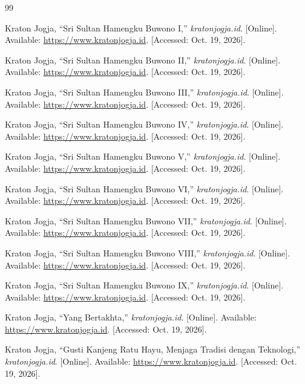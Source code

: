 \documentclass[11pt,a4paper]{article}
\begin{document}
\begin{thebibliography}{99}
\raggedright
{}

 Kraton Jogja, ``Sri Sultan Hamengku Buwono I,'' \emph{kratonjogja.id}. [Online]. Available: \url{https://www.kratonjogja.id}. [Accessed: Oct. 19, 2026].

 Kraton Jogja, ``Sri Sultan Hamengku Buwono II,'' \emph{kratonjogja.id}. [Online]. Available: \url{https://www.kratonjogja.id}. [Accessed: Oct. 19, 2026].

 Kraton Jogja, ``Sri Sultan Hamengku Buwono III,'' \emph{kratonjogja.id}. [Online]. Available: \url{https://www.kratonjogja.id}. [Accessed: Oct. 19, 2026].

 Kraton Jogja, ``Sri Sultan Hamengku Buwono IV,'' \emph{kratonjogja.id}. [Online]. Available: \url{https://www.kratonjogja.id}. [Accessed: Oct. 19, 2026].

 Kraton Jogja, ``Sri Sultan Hamengku Buwono V,'' \emph{kratonjogja.id}. [Online]. Available: \url{https://www.kratonjogja.id}. [Accessed: Oct. 19, 2026].

 Kraton Jogja, ``Sri Sultan Hamengku Buwono VI,'' \emph{kratonjogja.id}. [Online]. Available: \url{https://www.kratonjogja.id}. [Accessed: Oct. 19, 2026].

 Kraton Jogja, ``Sri Sultan Hamengku Buwono VII,'' \emph{kratonjogja.id}. [Online]. Available: \url{https://www.kratonjogja.id}. [Accessed: Oct. 19, 2026].

 Kraton Jogja, ``Sri Sultan Hamengku Buwono VIII,'' \emph{kratonjogja.id}. [Online]. Available: \url{https://www.kratonjogja.id}. [Accessed: Oct. 19, 2026].

 Kraton Jogja, ``Sri Sultan Hamengku Buwono IX,'' \emph{kratonjogja.id}. [Online]. Available: \url{https://www.kratonjogja.id}. [Accessed: Oct. 19, 2026].

 Kraton Jogja, ``Yang Bertakhta,'' \emph{kratonjogja.id}. [Online]. Available: \url{https://www.kratonjogja.id}. [Accessed: Oct. 19, 2026].

 Kraton Jogja, ``Gusti Kanjeng Ratu Hayu, Menjaga Tradisi dengan Teknologi,'' \emph{kratonjogja.id}. [Online]. Available: \url{https://www.kratonjogja.id}. [Accessed: Oct. 19, 2026].


\end{thebibliography}
\end{document}
